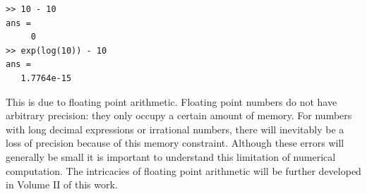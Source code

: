 \begin{lstlisting}[style=matlab]
>> 10 - 10
ans =
     0
>> exp(log(10)) - 10
ans =
   1.7764e-15
\end{lstlisting}

This is due to floating point arithmetic. Floating point numbers do not have arbitrary precision: they only occupy a certain amount of memory.  For numbers with long decimal expressions or irrational numbers, there will inevitably be a loss of precision because of this memory constraint.  Although these errors will generally be small it is important to understand this limitation of numerical computation. The intricacies of floating point arithmetic will be further developed in Volume II of this work.
